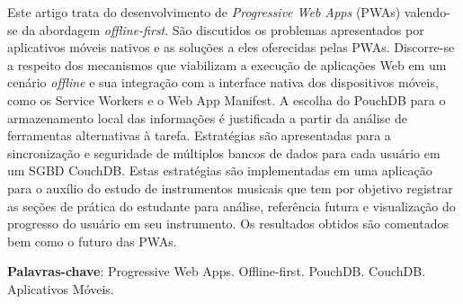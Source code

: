 \documentclass[
	article,			%
	11pt,				%
	oneside,			%
	a4paper,			%
	english,			%
	brazil,				%
	sumario=tradicional
	]{abntex2}
\begin{document}

\frenchspacing 


%
%
\maketitle

\begin{resumoumacoluna}
Este artigo trata do desenvolvimento de \textit{Progressive Web Apps} (PWAs) valendo-se da abordagem \textit{offline-first}. São discutidos os problemas apresentados por aplicativos móveis nativos e as soluções a eles oferecidas pelas PWAs. Discorre-se a respeito dos mecanismos que viabilizam a execução de aplicações Web em um cenário \textit{offline} e sua integração com a interface nativa dos dispositivos móveis, como os Service Workers e o Web App Manifest. A escolha do PouchDB para o armazenamento local das informações é justificada a partir da análise de ferramentas alternativas à tarefa. Estratégias são apresentadas para a sincronização e seguridade de múltiplos bancos de dados para cada usuário em um SGBD CouchDB. Estas estratégias são implementadas em uma aplicação para o auxílio do estudo de instrumentos musicais que tem por objetivo registrar as seções de prática do estudante para análise, referência futura e visualização do progresso do usuário em seu instrumento. Os resultados obtidos são comentados bem como o futuro das PWAs.
\vspace{\onelineskip}

\noindent
\textbf{Palavras-chave}: Progressive Web Apps. Offline-first. PouchDB. CouchDB. Aplicativos Móveis.
\end{resumoumacoluna}


\textual
\end{document}
